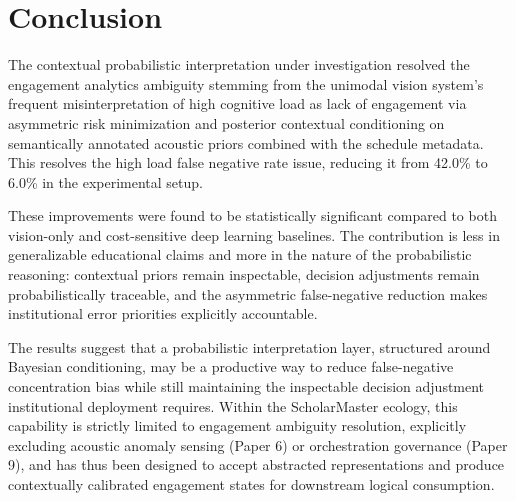 \documentclass[conference]{IEEEtran}
\begin{document}
\section{Conclusion}
The contextual probabilistic interpretation under investigation resolved the engagement analytics ambiguity stemming from the unimodal vision system’s frequent misinterpretation of high cognitive load as lack of engagement via asymmetric risk minimization and posterior contextual conditioning on semantically annotated acoustic priors combined with the schedule metadata. This resolves the high load false negative rate issue, reducing it from 42.0\% to 6.0\% in the experimental setup.

These improvements were found to be statistically significant compared to both vision-only and cost-sensitive deep learning baselines. The contribution is less in generalizable educational claims and more in the nature of the probabilistic reasoning: contextual priors remain inspectable, decision adjustments remain probabilistically traceable, and the asymmetric false-negative reduction makes institutional error priorities explicitly accountable.

The results suggest that a probabilistic interpretation layer, structured around Bayesian conditioning, may be a productive way to reduce false-negative concentration bias while still maintaining the inspectable decision adjustment institutional deployment requires. Within the ScholarMaster ecology, this capability is strictly limited to engagement ambiguity resolution, explicitly excluding acoustic anomaly sensing (Paper 6) or orchestration governance (Paper 9), and has thus been designed to accept abstracted representations and produce contextually calibrated engagement states for downstream logical consumption.
\end{document}
